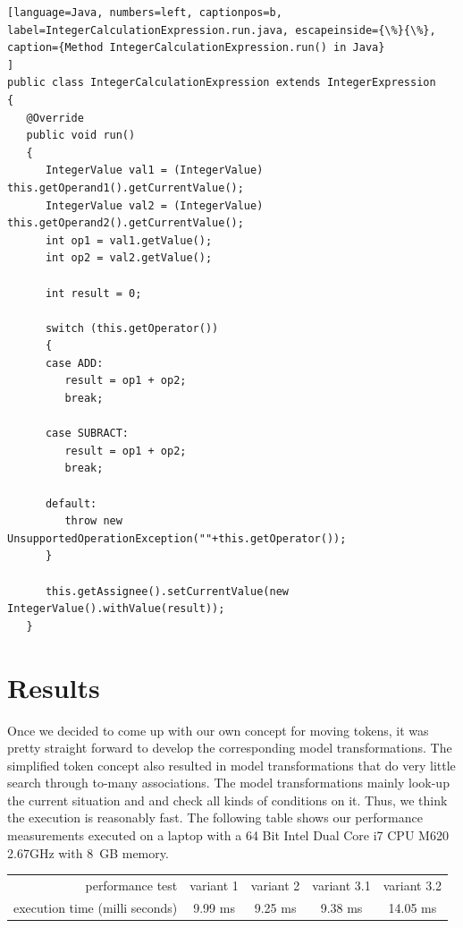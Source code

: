 \documentclass[submission,copyright,creativecommons]{eptcs}
\begin{document}
\begin{lstlisting}[language=Java, numbers=left, captionpos=b, 
label=IntegerCalculationExpression.run.java, escapeinside={\%}{\%},
caption={Method IntegerCalculationExpression.run() in Java}
]
public class IntegerCalculationExpression extends IntegerExpression
{
   @Override
   public void run()
   {
      IntegerValue val1 = (IntegerValue) this.getOperand1().getCurrentValue();
      IntegerValue val2 = (IntegerValue) this.getOperand2().getCurrentValue();
      int op1 = val1.getValue();
      int op2 = val2.getValue();
      
      int result = 0;
      
      switch (this.getOperator())
      {
      case ADD:
         result = op1 + op2;
         break;

      case SUBRACT:
         result = op1 + op2;
         break;

      default:
         throw new UnsupportedOperationException(""+this.getOperator());
      }
      
      this.getAssignee().setCurrentValue(new IntegerValue().withValue(result));      
   }
\end{lstlisting}



\section{Results}
\label{sec:results}

Once we decided to come up with our own concept for moving tokens, it was pretty straight 
forward to develop the corresponding model transformations. The simplified token concept also resulted in model transformations that do very little search through to-many associations. The model transformations mainly look-up the current situation and and check all kinds of conditions on it. Thus, we think the execution is reasonably fast. The following table shows our performance measurements executed on a laptop with a 64 Bit Intel Dual Core i7 CPU M620 2.67GHz with 8~GB memory.   

\begin{center}
	\begin{tabular} { r c c c c } 
		performance test               & variant 1 & variant 2 & variant 3.1 & variant 3.2 \\
		execution time (milli seconds) & 9.99 ms & 9.25 ms & 9.38 ms & 14.05 ms
	\end{tabular}
\end{center}
\end{document}
